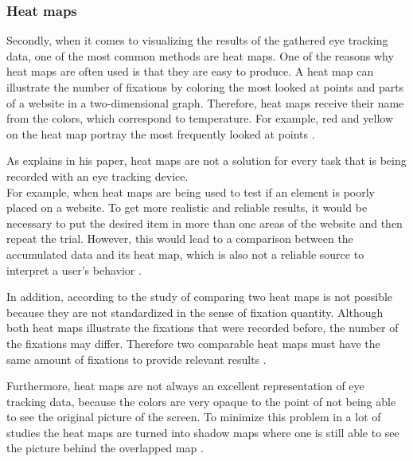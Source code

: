 \subsubsection{Heat maps}
Secondly, when it comes to visualizing the results of the gathered eye tracking data, one of the most common methods are heat maps. One of the reasons why heat maps are often used is that they are easy to produce. 
A heat map can illustrate the number of fixations by coloring the most looked at points and parts of a website in a two-dimensional graph. Therefore, heat maps receive their name from the colors, which correspond to temperature. For example, red and yellow on the heat map portray the most frequently looked at points \autocite[]{bojko2009informative}. 

As \textcite[]{bojko2009informative} explains in his paper, heat maps are not a solution for every task that is being recorded with an eye tracking device. \\
For example, when heat maps are being used to test if an element is poorly placed on a website. To get more realistic and reliable results, it would be necessary to put the desired item in more than one areas of the website and then repeat the trial. However, this would lead to a comparison between the accumulated data and its heat map, which is also not a reliable source to interpret a user's behavior \autocite[]{bojko2009informative}. 

In addition, according to the study of \textcite[]{djamasbi2010efficiency} comparing two heat maps is not possible because they are not standardized in the sense of fixation quantity. Although both heat maps illustrate the fixations that were recorded before, the number of the fixations may differ. Therefore two comparable heat maps must have the same amount of fixations to provide relevant results \autocite[]{djamasbi2010efficiency}. 

Furthermore, heat maps are not always an excellent representation of eye tracking data, because the colors are very opaque to the point of not being able to see the original picture of the screen. To minimize this problem in a lot of studies the heat maps are turned into shadow maps where one is still able to see the picture behind the overlapped map \autocite[]{vspakov2007visualization}.


